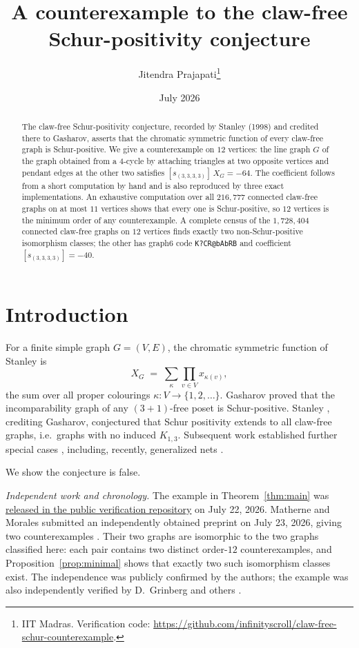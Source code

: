\documentclass[11pt]{article}
\title{A counterexample to the claw-free Schur-positivity conjecture}
\author{Jitendra Prajapati\thanks{IIT Madras. Verification code:
\url{https://github.com/infinityscroll/claw-free-schur-counterexample}.}}
\date{July 2026}
\theoremstyle{remark}
\newcommand{\csf}{X}
\begin{document}
\maketitle

\begin{abstract}
The claw-free Schur-positivity conjecture, recorded by Stanley (1998) and
credited there to Gasharov, asserts that the chromatic symmetric function of
every claw-free graph is Schur-positive. We give a counterexample
on $12$ vertices: the line graph $G$ of the graph obtained from a
$4$-cycle by attaching triangles at two opposite vertices and pendant edges
at the other two satisfies $[s_{(3,3,3,3)}]\,\csf_G = -64$. The coefficient
follows from a short computation by hand and is also reproduced by three exact
implementations. An exhaustive computation over all
$216{,}777$ connected claw-free graphs on at most $11$ vertices shows that
every one is Schur-positive, so $12$ vertices is the minimum order of any
counterexample. A complete census of the $1{,}728{,}404$ connected claw-free
graphs on $12$ vertices finds exactly two non-Schur-positive isomorphism
classes; the other has graph6 code
\texttt{K?\textasciigrave CR@\textasciigrave bAbRB} and coefficient
$[s_{(3,3,3,3)}]=-40$.
\end{abstract}

\section{Introduction}

For a finite simple graph $G = (V, E)$, the chromatic symmetric function of
Stanley \cite{Stanley95} is
\[
\csf_G \;=\; \sum_{\kappa} \prod_{v \in V} x_{\kappa(v)},
\]
the sum over all proper colourings $\kappa \colon V \to \{1, 2, \dots\}$.
Gasharov \cite{Gasharov96} proved that the incomparability graph of any
$(3+1)$-free poset is Schur-positive. Stanley
\cite[Conjecture~1.4]{Stanley98}, crediting Gasharov, conjectured that Schur
positivity extends to all claw-free graphs, i.e.\ graphs with no induced
$K_{1,3}$. Subsequent work established further special cases
\cite{Gasharov99}, including, recently, generalized nets \cite{SW25}.

We show the conjecture is false.

\emph{Independent work and chronology.} The example in
Theorem~\ref{thm:main} was
\href{https://github.com/infinityscroll/claw-free-schur-counterexample/commit/7747970833d8d4ce2dadba8f89a184cb52d814a9}
{released in the public verification repository} on July 22, 2026.
Matherne and Morales submitted an independently obtained
preprint on July 23, 2026, giving two counterexamples \cite{MM26}. Their two
graphs are isomorphic to the two graphs classified here: each pair contains
two distinct order-$12$ counterexamples, and Proposition~\ref{prop:minimal}
shows that exactly two such isomorphism classes exist. The independence was
publicly confirmed by the authors; the example was also independently
verified by D.~Grinberg and others \cite{MO}.
\end{document}
